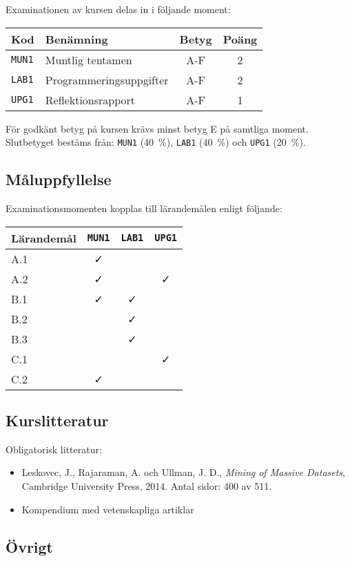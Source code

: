 Examinationen av kursen delas in i följande moment:

\begin{longtable}[]{@{}llcc@{}}
\toprule
\textsf{Kod} & \textsf{Benämning} & \textsf{Betyg} & \textsf{Poäng}\tabularnewline
\midrule
\endhead
\texttt{MUN1} & Muntlig tentamen & A-F & 2\tabularnewline
\texttt{LAB1} & Programmeringsuppgifter & A-F & 2\tabularnewline
\texttt{UPG1} & Reflektionsrapport & A-F & 1\tabularnewline
\bottomrule
\end{longtable}

För godkänt betyg på kursen krävs minst betyg E på samtliga moment.
Slutbetyget bestäms från: \texttt{MUN1} (40~\%), \texttt{LAB1} (40~\%) och \texttt{UPG1} (20~\%).

\subsection*{Måluppfyllelse}

Examinationsmomenten kopplas till lärandemålen enligt följande:

\begin{longtable}[]{@{}lccc@{}}
\toprule
\textsf{Lärandemål} & \texttt{MUN1} & \texttt{LAB1} & \texttt{UPG1}\tabularnewline
\midrule
\endhead
A.1 & \faCheck & &\tabularnewline
A.2 & \faCheck & & \faCheck\tabularnewline
B.1 & \faCheck & \faCheck &\tabularnewline
B.2 & & \faCheck &\tabularnewline
B.3 & & \faCheck &\tabularnewline
C.1 & & & \faCheck\tabularnewline
C.2 & \faCheck & &\tabularnewline
\bottomrule
\end{longtable}

\subsection*{Kurslitteratur}

Obligatorisk litteratur:

\begin{itemize}
\tightlist
\item
  Leskovec, J., Rajaraman, A. och Ullman, J. D., \emph{Mining of Massive
  Datasets}, Cambridge University Press, 2014. Antal sidor: 400 av 511.
\item
  Kompendium med vetenskapliga artiklar
\end{itemize}

\subsection*{Övrigt}

